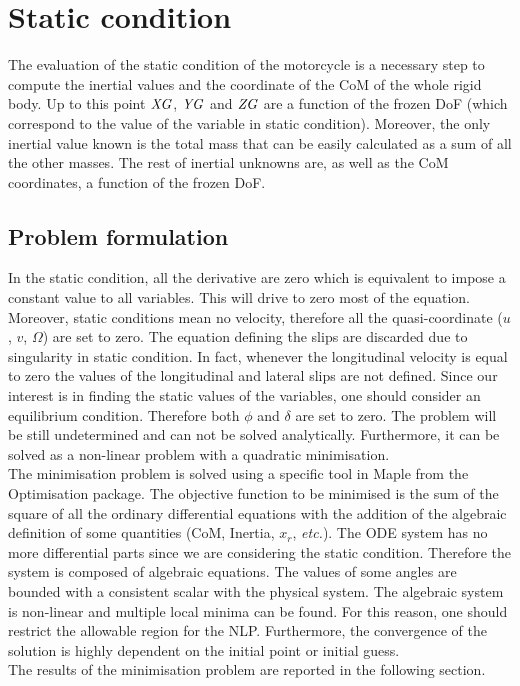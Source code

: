 \section{Static condition}
%
The evaluation of the static condition of the motorcycle is a necessary step to compute the inertial values and the coordinate of the CoM of the whole rigid body. Up to this point ${\it XG}$, ${\it YG}$ and ${\it ZG}$ are a function of the frozen DoF (which correspond to the value of the variable in static condition). Moreover, the only inertial value known is the total mass that can be easily calculated as a sum of all the other masses. The rest of inertial unknowns are, as well as the CoM coordinates, a function of the frozen DoF.  
%
\subsection{Problem formulation}
%
In the static condition, all the derivative are zero which is equivalent to impose a constant value to all variables. This will drive to zero most of the equation. Moreover, static conditions mean no velocity, therefore all the quasi-coordinate ($u$, $v$, $\Omega$) are set to zero. The equation defining the slips are discarded due to singularity in static condition. In fact, whenever the longitudinal velocity is equal to zero the values of the longitudinal and lateral slips are not defined. Since our interest is in finding the static values of the variables, one should consider an equilibrium condition. Therefore both $\phi$ and $\delta$ are set to zero. The problem will be still undetermined and can not be solved analytically. Furthermore, it can be solved as a non-linear problem with a quadratic minimisation.\\
The minimisation problem is solved using a specific tool in Maple from the Optimisation package.
The objective function to be minimised is the sum of the square of all the ordinary differential equations with the addition of the algebraic definition of some quantities (CoM, Inertia, $x_r$, \textit{etc.}). The ODE system has no more differential parts since we are considering the static condition. Therefore the system is composed of algebraic equations. The values of some angles are bounded with a consistent scalar with the physical system. The algebraic system is non-linear and multiple local minima can be found. For this reason, one should restrict the allowable region for the NLP. Furthermore, the convergence of the solution is highly dependent on the initial point or initial guess.\\
The results of the minimisation problem are reported in the following section.
%
